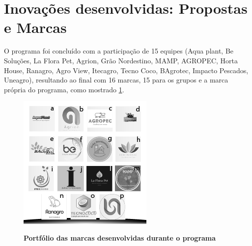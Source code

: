 \section{Inovações desenvolvidas: Propostas e Marcas}
\label{inovacoes}

O programa foi concluído  com a participação de 15 equipes (Aqua plant, Be Soluções, La Flora Pet, Agrion, Grão Nordestino, MAMP, AGROPEC, Horta House, Ranagro, Agro View, Itecagro, Tecno Coco, BAgrotec, Impacto Pescados, Uneagro), resultando ao final com 16 marcas, 15 para os grupos e a marca própria do programa, como mostrado  \ref{figura_12}.




\begin{figure}[H]
\centering
\caption{\textbf{Portfólio das marcas desenvolvidas durante o programa}}
\includegraphics[scale=3]{Imagens/portfolio.png}
\label{figura_12}
\end{figure}


